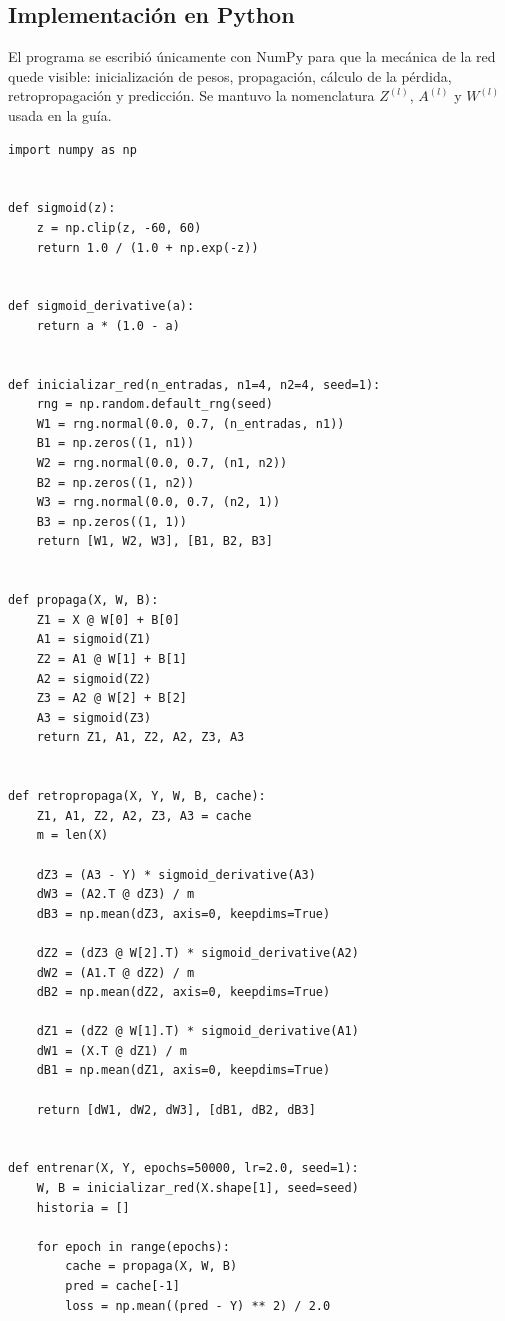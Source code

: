 \documentclass[14pt,twoside]{article}
\begin{document}
\subsection{Implementación en Python}

El programa se escribió únicamente con NumPy para que la mecánica de la red quede visible: inicialización de pesos, propagación, cálculo de la pérdida, retropropagación y predicción. Se mantuvo la nomenclatura $Z^{(l)}$, $A^{(l)}$ y $W^{(l)}$ usada en la guía.

\begin{lstlisting}[style=pgpython,caption={Implementación desde cero de una red con dos capas ocultas.}]
import numpy as np


def sigmoid(z):
    z = np.clip(z, -60, 60)
    return 1.0 / (1.0 + np.exp(-z))


def sigmoid_derivative(a):
    return a * (1.0 - a)


def inicializar_red(n_entradas, n1=4, n2=4, seed=1):
    rng = np.random.default_rng(seed)
    W1 = rng.normal(0.0, 0.7, (n_entradas, n1))
    B1 = np.zeros((1, n1))
    W2 = rng.normal(0.0, 0.7, (n1, n2))
    B2 = np.zeros((1, n2))
    W3 = rng.normal(0.0, 0.7, (n2, 1))
    B3 = np.zeros((1, 1))
    return [W1, W2, W3], [B1, B2, B3]


def propaga(X, W, B):
    Z1 = X @ W[0] + B[0]
    A1 = sigmoid(Z1)
    Z2 = A1 @ W[1] + B[1]
    A2 = sigmoid(Z2)
    Z3 = A2 @ W[2] + B[2]
    A3 = sigmoid(Z3)
    return Z1, A1, Z2, A2, Z3, A3


def retropropaga(X, Y, W, B, cache):
    Z1, A1, Z2, A2, Z3, A3 = cache
    m = len(X)

    dZ3 = (A3 - Y) * sigmoid_derivative(A3)
    dW3 = (A2.T @ dZ3) / m
    dB3 = np.mean(dZ3, axis=0, keepdims=True)

    dZ2 = (dZ3 @ W[2].T) * sigmoid_derivative(A2)
    dW2 = (A1.T @ dZ2) / m
    dB2 = np.mean(dZ2, axis=0, keepdims=True)

    dZ1 = (dZ2 @ W[1].T) * sigmoid_derivative(A1)
    dW1 = (X.T @ dZ1) / m
    dB1 = np.mean(dZ1, axis=0, keepdims=True)

    return [dW1, dW2, dW3], [dB1, dB2, dB3]


def entrenar(X, Y, epochs=50000, lr=2.0, seed=1):
    W, B = inicializar_red(X.shape[1], seed=seed)
    historia = []

    for epoch in range(epochs):
        cache = propaga(X, W, B)
        pred = cache[-1]
        loss = np.mean((pred - Y) ** 2) / 2.0


\end{lstlisting}
\end{document}

